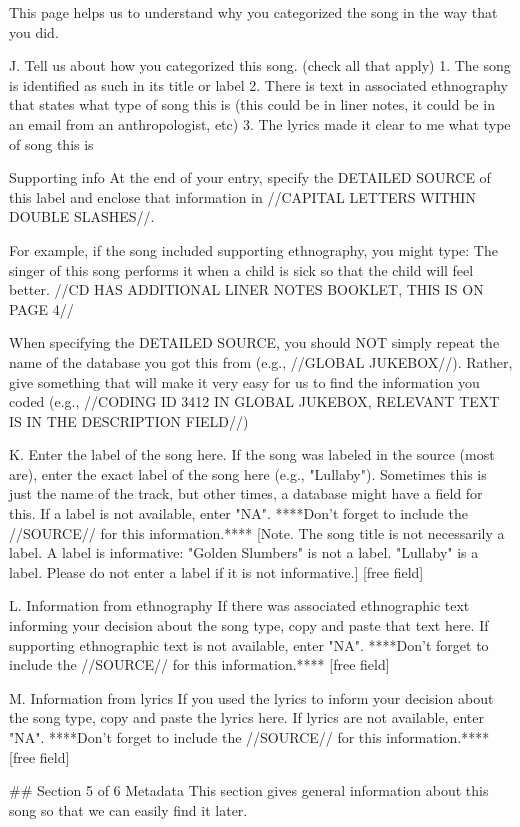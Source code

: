 This page helps us to understand why you categorized the song in the way that you did.

J. Tell us about how you categorized this song. (check all that apply)
1. The song is identified as such in its title or label
2. There is text in associated ethnography that states what type of song this is (this could be in liner notes, it could be in an email from an anthropologist, etc)
3. The lyrics made it clear to me what type of song this is

Supporting info
At the end of your entry, specify the DETAILED SOURCE of this label and enclose that information in //CAPITAL LETTERS WITHIN DOUBLE SLASHES//.

For example, if the song included supporting ethnography, you might type:
The singer of this song performs it when a child is sick so that the child will feel better. //CD HAS ADDITIONAL LINER NOTES BOOKLET, THIS IS ON PAGE 4//

When specifying the DETAILED SOURCE, you should NOT simply repeat the name of the database you got this from (e.g., //GLOBAL JUKEBOX//). Rather, give something that will make it very easy for us to find the information you coded (e.g., //CODING ID 3412 IN GLOBAL JUKEBOX, RELEVANT TEXT IS IN THE DESCRIPTION FIELD//)

K. Enter the label of the song here.
If the song was labeled in the source (most are), enter the exact label of the song here (e.g., "Lullaby"). Sometimes this is just the name of the track, but other times, a database might have a field for this. If a label is not available, enter "NA". ****Don't forget to include the //SOURCE// for this information.**** [Note. The song title is not necessarily a label. A label is informative: "Golden Slumbers" is not a label. "Lullaby" is a label. Please do not enter a label if it is not informative.]
[free field]

L. Information from ethnography
If there was associated ethnographic text informing your decision about the song type, copy and paste that text here. If supporting ethnographic text is not available, enter "NA".  ****Don't forget to include the //SOURCE// for this information.****
[free field]

M. Information from lyrics
If you used the lyrics to inform your decision about the song type, copy and paste the lyrics here. If lyrics are not available, enter "NA". ****Don't forget to include the //SOURCE// for this information.****
[free field]

## Section 5 of 6
Metadata
This section gives general information about this song so that we can easily find it later.

